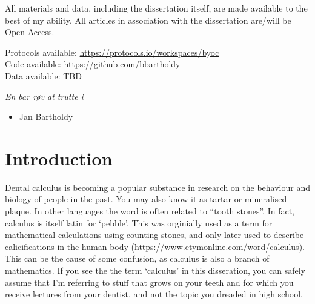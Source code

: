 \documentclass[
  letterpaper,
]{book}
\providecommand{\tightlist}{%
  \setlength{\itemsep}{0pt}\setlength{\parskip}{0pt}}
\begin{document}

All materials and data, including the dissertation itself, are made
available to the best of my ability. All articles in association with
the dissertation are/will be Open Access.

Protocols available: \url{https://protocols.io/workspaces/byoc}\\
Code available: \url{https://github.com/bbartholdy}\\
Data available: TBD

\clearpage
\thispagestyle{empty}
\vspace*{3cm}

\textit{En bar røv at trutte i} \vspace*{\fill}

\par
\vspace*{4cm}

\begin{itemize}
\tightlist
\item
  Jan Bartholdy
\end{itemize}

\mainmatter


\hypertarget{chap-intro}{%
\chapter{Introduction}\label{chap-intro}}

Dental calculus is becoming a popular substance in research on the
behaviour and biology of people in the past. You may also know it as
tartar or mineralised plaque. In other languages the word is often
related to ``tooth stones''. In fact, calculus is itself latin for
`pebble'. This was orginially used as a term for mathematical
calculations using counting stones, and only later used to describe
calicifications in the human body
(\url{https://www.etymonline.com/word/calculus}). This can be the cause
of some confusion, as calculus is also a branch of mathematics. If you
see the the term `calculus' in this disseration, you can safely assume
that I'm referring to stuff that grows on your teeth and for which you
receive lectures from your dentist, and not the topic you dreaded in
high school.
\end{document}
